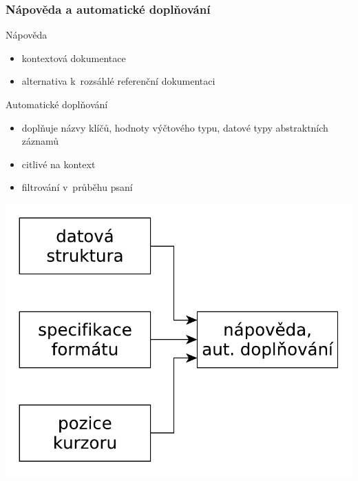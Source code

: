 \begin{frame}[fragile]
	\frametitle{Nápověda a automatické doplňování}
	\vspace*{-20pt}
	\pause
	\begin{minipage}[t]{0.55\textwidth}
	\begin{block}{Nápověda}
	\begin{itemize}[<+>]
		\item kontextová dokumentace
		\item alternativa k~rozsáhlé referenční dokumentaci
	\end{itemize}
	\end{block}
	\begin{block}{Automatické doplňování}
	\begin{itemize}[<+>]
		\item doplňuje názvy klíčů, hodnoty výčtového typu, datové typy abstraktních záznamů
		\item citlivé na kontext
		\item filtrování v~průběhu psaní
	\end{itemize}
	\end{block}
	\end{minipage}
	\hspace*{-10pt}
	\begin{minipage}[t]{0.35\textwidth}
	\vspace{45pt}
	\includegraphics[width=1.4\textwidth]{../../img/documentation_autocompletion.pdf}\\
	\end{minipage}
\end{frame}

